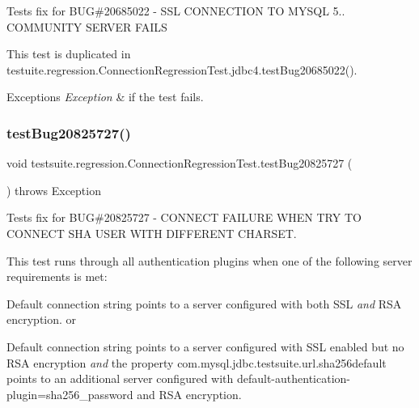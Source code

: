Tests fix for B\+UG\#20685022 -\/ S\+SL C\+O\+N\+N\+E\+C\+T\+I\+ON TO M\+Y\+S\+QL 5.. C\+O\+M\+M\+U\+N\+I\+TY S\+E\+R\+V\+ER F\+A\+I\+LS

This test is duplicated in testuite.\+regression.\+Connection\+Regression\+Test.\+jdbc4.\+test\+Bug20685022().


\begin{DoxyExceptions}{Exceptions}
{\em Exception} & if the test fails. \\
\hline
\end{DoxyExceptions}
\mbox{\label{classtestsuite_1_1regression_1_1_connection_regression_test_a90f5472dadf388f9b00461fc39ddeb21}} 
\subsubsection{\texorpdfstring{test\+Bug20825727()}{testBug20825727()}}
{\footnotesize\ttfamily void testsuite.\+regression.\+Connection\+Regression\+Test.\+test\+Bug20825727 (\begin{DoxyParamCaption}{ }\end{DoxyParamCaption}) throws Exception}

Tests fix for B\+UG\#20825727 -\/ C\+O\+N\+N\+E\+CT F\+A\+I\+L\+U\+RE W\+H\+EN T\+RY TO C\+O\+N\+N\+E\+CT S\+HA U\+S\+ER W\+I\+TH D\+I\+F\+F\+E\+R\+E\+NT C\+H\+A\+R\+S\+ET.

This test runs through all authentication plugins when one of the following server requirements is met\+:
\begin{DoxyEnumerate}
\item Default connection string points to a server configured with both S\+SL {\itshape and} R\+SA encryption. or
\item Default connection string points to a server configured with S\+SL enabled but no R\+SA encryption {\itshape and} the property com.\+mysql.\+jdbc.\+testsuite.\+url.\+sha256default points to an additional server configured with default-\/authentication-\/plugin=sha256\+\_\+password and R\+SA encryption.
\end{DoxyEnumerate}

